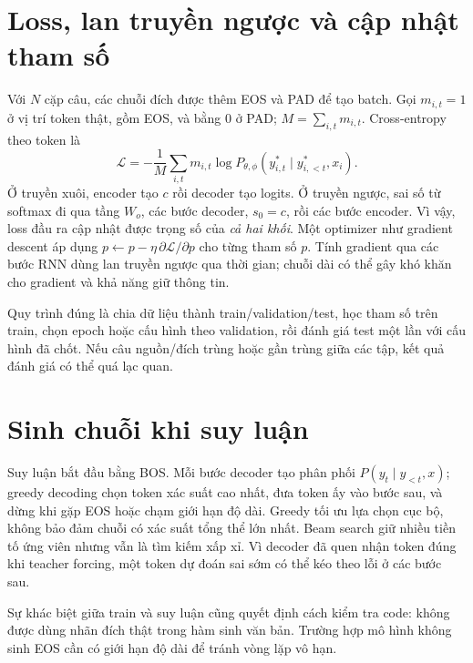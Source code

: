 \documentclass[11pt,a4paper]{article}
\begin{document}
\section{Loss, lan truyền ngược và cập nhật tham số}
Với $N$ cặp câu, các chuỗi đích được thêm EOS và PAD để tạo batch. Gọi $m_{i,t}=1$ ở vị trí token thật, gồm EOS, và bằng $0$ ở PAD; $M=\sum_{i,t}m_{i,t}$. Cross-entropy theo token là
\begin{equation}
\mathcal L=-\frac1M\sum_{i,t}m_{i,t}\log P_{\theta,\phi}(y^*_{i,t}\mid y^*_{i,<t},x_i).
\end{equation}
Ở truyền xuôi, encoder tạo $c$ rồi decoder tạo logits. Ở truyền ngược, sai số từ softmax đi qua tầng $W_o$, các bước decoder, $s_0=c$, rồi các bước encoder. Vì vậy, loss đầu ra cập nhật được trọng số của \emph{cả hai khối}. Một optimizer như gradient descent áp dụng $p\leftarrow p-\eta\,\partial\mathcal L/\partial p$ cho từng tham số $p$. Tính gradient qua các bước RNN dùng lan truyền ngược qua thời gian; chuỗi dài có thể gây khó khăn cho gradient và khả năng giữ thông tin.

Quy trình đúng là chia dữ liệu thành train/validation/test, học tham số trên train, chọn epoch hoặc cấu hình theo validation, rồi đánh giá test một lần với cấu hình đã chốt. Nếu câu nguồn/đích trùng hoặc gần trùng giữa các tập, kết quả đánh giá có thể quá lạc quan.

\section{Sinh chuỗi khi suy luận}
Suy luận bắt đầu bằng BOS. Mỗi bước decoder tạo phân phối $P(y_t\mid y_{<t},x)$; greedy decoding chọn token xác suất cao nhất, đưa token ấy vào bước sau, và dừng khi gặp EOS hoặc chạm giới hạn độ dài. Greedy tối ưu lựa chọn cục bộ, không bảo đảm chuỗi có xác suất tổng thể lớn nhất. Beam search giữ nhiều tiền tố ứng viên nhưng vẫn là tìm kiếm xấp xỉ. Vì decoder đã quen nhận token đúng khi teacher forcing, một token dự đoán sai sớm có thể kéo theo lỗi ở các bước sau.

Sự khác biệt giữa train và suy luận cũng quyết định cách kiểm tra code: không được dùng nhãn đích thật trong hàm sinh văn bản. Trường hợp mô hình không sinh EOS cần có giới hạn độ dài để tránh vòng lặp vô hạn.
\end{document}
